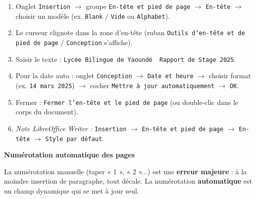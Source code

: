 \documentclass[11pt]{article}
\begin{document}
\begin{methode}
    \begin{enumerate}
        \item Onglet \texttt{Insertion} $\rightarrow$ groupe \texttt{En-tête et pied de page} $\rightarrow$ \texttt{En-tête} $\rightarrow$ choisir un modèle (ex. \texttt{Blank} / \texttt{Vide} ou \texttt{Alphabet}).
        \item Le curseur clignote dans la zone d'en-tête (ruban \texttt{Outils d'en-tête et de pied de page} / \texttt{Conception} s'affiche).
        \item Saisir le texte : \texttt{Lycée Bilingue de Yaoundé \textbar\ Rapport de Stage 2025}.
        \item Pour la date auto : onglet \texttt{Conception} $\rightarrow$ \texttt{Date et heure} $\rightarrow$ choisir format (ex. \texttt{14 mars 2025}) $\rightarrow$ cocher \texttt{Mettre à jour automatiquement} $\rightarrow$ \texttt{OK}.
        \item Fermer : \texttt{Fermer l'en-tête et le pied de page} (ou double-clic dans le corps du document).
        \item \textit{Note LibreOffice Writer :} \texttt{Insertion} $\rightarrow$ \texttt{En-tête et pied de page} $\rightarrow$ \texttt{En-tête} $\rightarrow$ \texttt{Style par défaut}.
    \end{enumerate}
\end{methode}

\textbf{Numérotation automatique des pages}\par

La numérotation manuelle (taper « 1 », « 2 »...) est une \textbf{erreur majeure} : à la moindre insertion de paragraphe, tout décale. La numérotation \textbf{automatique} est un champ dynamique qui se met à jour seul.
\end{document}
